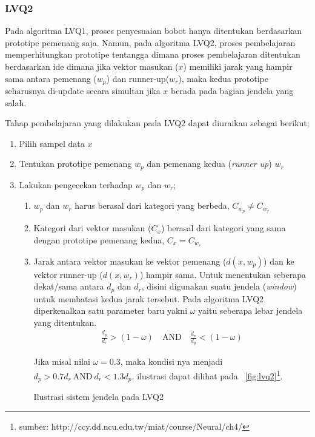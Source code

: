 \subsubsection{LVQ2}
Pada algoritma LVQ1, proses penyesuaian bobot hanya ditentukan berdasarkan
prototipe pemenang saja. Namun, pada algoritma LVQ2, proses pembelajaran
memperhitungkan prototipe tentangga dimana proses pembelajaran ditentukan
berdasarkan ide dimana jika vektor masukan ($x$) memiliki jarak yang hampir sama
antara pemenang ($w_p$) dan runner-up($w_r$), maka kedua prototipe seharusnya
di-update secara simultan jika $x$ berada pada bagian jendela yang salah.

\noindent
Tahap pembelajaran yang dilakukan pada LVQ2 dapat diuraikan sebagai berikut;
\begin{enumerate}
  \setlength{\itemsep}{1pt}
  \setlength{\parskip}{0pt}
  \setlength{\parsep}{0pt}
  \item Pilih sampel data $x$
  \item Tentukan prototipe pemenang $w_p$ dan pemenang kedua (\textit{runner
  up}) $w_r$
  \item Lakukan pengecekan terhadap $w_p$ dan $w_r$;
  \begin{enumerate}
    \item $w_p$ dan $w_r$ harus berasal dari kategori yang berbeda, $C_{w_p}
    \neq C_{w_r}$
    \item Kategori dari vektor masukan ($C_x$) berasal dari kategori yang sama
    dengan prototipe pemenang kedua, $C_x = C_{w_r}$
    \item Jarak antara vektor masukan ke vektor pemenang ($d(x, w_p)$) dan
    ke vektor runner-up ($d(x, w_r)$) hampir sama. 
    Untuk menentukan seberapa dekat/sama antara $d_p$ dan $d_r$, disini
    digunakan suatu jendela (\textit{window}) untuk membatasi kedua jarak
    tersebut. Pada algoritma LVQ2 diperkenalkan satu parameter baru yakni
    $\omega$ yaitu seberapa lebar jendela yang ditentukan.
    \begin{align}
    \frac{d_p}{d_r} > (1 - \omega)\quad \text{AND}\quad \frac{d_r}{d_p} < (1 -
    \omega)
    \nonumber
    \end{align}
    
    Jika misal nilai $\omega=0.3$, maka kondisi nya menjadi $d_p > 0.7 d_r
   \ \text{AND}\ d_r < 1.3 d_p$. ilustrasi dapat dilihat pada
    \pic~\ref{fig:lvq2}\footnote{sumber:
    {http://ccy.dd.ncu.edu.tw/miat/course/Neural/ch4/}}.
    
    {Ilustrasi sistem jendela pada LVQ2} 
  \end{enumerate}
    

\end{enumerate}
